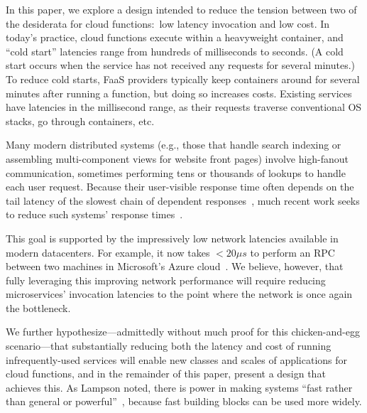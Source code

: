 In this paper, we explore a design intended to reduce the tension between two of
the desiderata for cloud functions:\ low latency invocation and low cost.  In
today's practice, cloud functions execute within a heavyweight container, and
``cold start'' latencies range from hundreds of milliseconds to seconds.  (A
cold start occurs when the service has not received any requests for several
minutes.)  To reduce cold starts, FaaS providers typically keep containers
around for several minutes after running a function, but doing so increases
costs.  Existing services have latencies in the millisecond range, as their requests
traverse conventional OS stacks, go through containers, etc.

Many modern distributed systems (e.g., those that handle search indexing or
assembling multi-component views for website front pages) involve
high-fanout communication, sometimes performing tens or thousands of
lookups to handle each user request.  Because their user-visible response time often
depends on the tail latency of the slowest chain of dependent
responses~\cite{Dean:cacm2013}, much recent work seeks to reduce
such systems' response
times~\cite{Jalaparti:sigcomm2013,Xu:nsdi2013,Li:socc2014,Jeon:asplos2016}.

This goal is supported by the impressively low network latencies available in
modern datacenters.  For example, it
now takes $<20\mu{}s$ to perform an RPC between two machines in Microsoft's Azure
cloud~\cite{www-firestone-azure-latency}.  We believe, however, that fully leveraging
this improving network performance will require reducing microservices' invocation
latencies to the point where the network is once again the bottleneck.

We further hypothesize---admittedly without much proof for this chicken-and-egg
scenario---that substantially reducing both the latency and cost of running
infrequently-used services will enable new classes and scales of applications
for cloud functions, and in the remainder of this paper, present a design that
achieves this.  As Lampson noted, there is power in making systems 
``fast rather than general or powerful''~\cite{Lampson1983}, because fast
building blocks can be used more widely.


